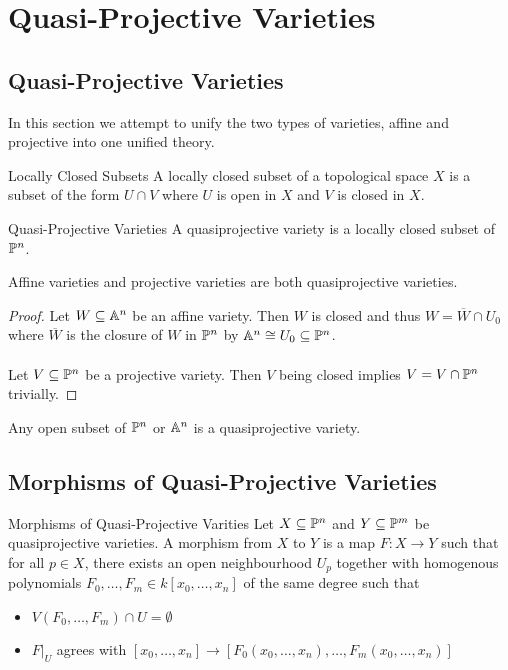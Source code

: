 \documentclass[a4paper]{article}
\begin{document}
\pagebreak
\section{Quasi-Projective Varieties}
\subsection{Quasi-Projective Varieties}
In this section we attempt to unify the two types of varieties, affine and projective into one unified theory. 

\begin{defn}{Locally Closed Subsets}{} A locally closed subset of a topological space $X$ is a subset of the form $U\cap V$ where $U$ is open in $X$ and $V$ is closed in $X$. 
\end{defn}

\begin{defn}{Quasi-Projective Varieties}{} A quasiprojective variety is a locally closed subset of $\mathbb{P}^n$. 
\end{defn}

\begin{lmm}{}{} Affine varieties and projective varieties are both quasiprojective varieties. \tcbline
\begin{proof}
Let $W\subseteq\mathbb{A}^n$ be an affine variety. Then $W$ is closed and thus $W=\overline{W}\cap U_0$ where $\overline{W}$ is the closure of $W$ in $\mathbb{P}^n$ by $\mathbb{A}^n\cong U_0\subseteq\mathbb{P}^n$. \\~\\
Let $V\subseteq\mathbb{P}^n$ be a projective variety. Then $V$ being closed implies $V=V\cap\mathbb{P}^n$ trivially. 
\end{proof}
\end{lmm}

\begin{lmm}{}{} Any open subset of $\mathbb{P}^n$ or $\mathbb{A}^n$ is a quasiprojective variety. 
\end{lmm}

\subsection{Morphisms of Quasi-Projective Varieties}
\begin{defn}{Morphisms of Quasi-Projective Varities}{} Let $X\subseteq\mathbb{P}^n$ and $Y\subseteq\mathbb{P}^m$ be quasiprojective varieties. A morphism from $X$ to $Y$  is a map $F:X\to Y$ such that for all $p\in X$, there exists an open neighbourhood $U_p$ together with homogenous polynomials $F_0,\dots,F_m\in k[x_0,\dots,x_n]$ of the same degree such that 
\begin{itemize}
\item $V(F_0,\dots,F_m)\cap U=\emptyset$
\item $F|_U$ agrees with $[x_0,\dots,x_n]\to[F_0(x_0,\dots,x_n),\dots,F_m(x_0,\dots,x_n)]$
\end{itemize}
\end{defn}
\end{document}
